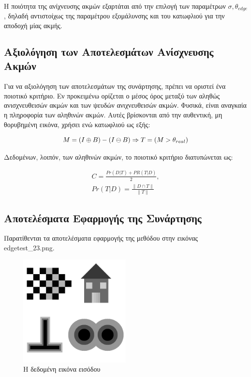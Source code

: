 \documentclass{article}
\newcommand{\eng}[1]{\foreignlanguage{english}{#1}}
\begin{document}
Η ποιότητα της ανίχνευσης ακμών εξαρτάται από την επιλογή των παραμέτρων $\sigma, \theta_{edge}$, δηλαδή αντιστοίχως της παραμέτρου εξομάλυνσης και του κατωφλιού για την αποδοχή μίας ακμής.

\subsection{Αξιολόγηση των Αποτελεσμάτων Ανίσχνευσης Ακμών}

Για να αξιολόγηση των αποτελεσμάτων της συνάρτησης, πρέπει να οριστεί ένα ποιοτικό κριτήριο. Εν προκειμένω ορίζεται ο μέσος όρος μεταξύ των αληθώς ανισχνευθεισών ακμών και των ψευδών ανιχνευθεισών ακμών. Φυσικά, είναι αναγκαία η πληροφορία των αληθινών ακμών. Αυτές βρίσκονται από την αυθεντική, μη θορυβημένη εικόνα, χρήσει ενώ κατωφλιού ως εξής:

\begin{equation}
    M = (I \oplus B) - (I \ominus B) \Rightarrow \\
    T = (M > \theta_{real})
\end{equation}

Δεδομένων, λοιπόν, των αληθινών ακμών, το ποιοτικό κριτήριο διατυπώνεται ως:

\begin{equation}
    \begin{gathered}
        C = \frac{Pr(D|T) + PR(T|D)}{2}, \\
        Pr(T|D) = \frac{\lVert D \cap T \rVert}{\lVert T \rVert}
    \end{gathered}
\end{equation}

\subsection{Αποτελέσματα Εφαρμογής της Συνάρτησης}

Παρατίθενται τα αποτελέσματα εφαρμογής της μεθόδου στην εικόνας \eng{edgetest\_23.png}.

\begin{figure}[h]
    \centering
    \includegraphics[width=0.5\textwidth]{image-plots/edgetest_23.png}
    \caption{Η δεδομένη εικόνα εισόδου}
    \label{fig:edge-test}
\end{figure}
\end{document}
